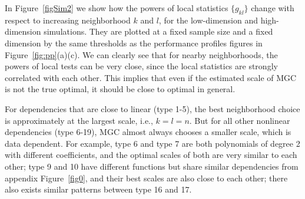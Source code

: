 \documentclass[11pt]{article}
\begin{document}
In Figure~\ref{figSim2} we show how the powers of local statistics $\{g_{kl}\}$ change with respect to increasing neighborhood $k$ and $l$, for the low-dimension and high-dimension simulations. They are plotted at a fixed sample size and a fixed dimension by the same thresholds as the performance profiles figures in Figure~\ref{fig:pp}(a)(c). We can clearly see that for nearby neighborhoods, the powers of local tests can be very close, since the local statistics are strongly correlated with each other. This implies that even if the estimated scale of MGC is not the true optimal, it should be close to optimal in general.

For dependencies that are close to linear (type 1-5), the best neighborhood choice is approximately at the largest scale, i.e., $k=l=n$. But for all other nonlinear dependencies (type 6-19), MGC almost always chooses a smaller scale, which is data dependent. For example, type 6 and type 7 are both polynomials of degree 2 with different coefficients, and the optimal scales of both are very similar to each other; type 9 and 10 have different functions but share similar dependencies from appendix Figure~\ref{fig0}, and their best scales are also close to each other; there also exists similar patterns between type 16 and 17.
\end{document}
